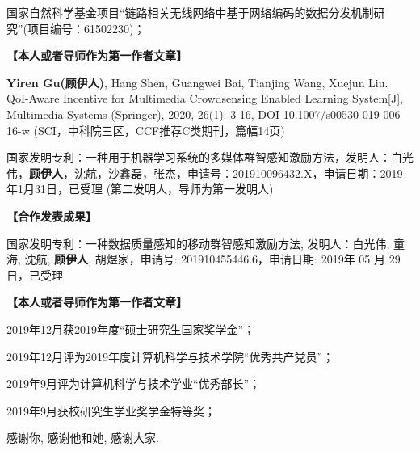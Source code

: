 

\project
\thispagestyle{onlytitle}
\begin{enumerate}[{[1]}]
	\item   国家自然科学基金项目“链路相关无线网络中基于网络编码的数据分发机制研究”(项目编号：61502230)；
\end{enumerate}


\achievement
\thispagestyle{onlytitle}
 \textbf{【本人或者导师作为第一作者文章】}
\begin{enumerate}[{[1]}]
	\item   \textbf{Yiren Gu(顾伊人)}, Hang Shen, Guangwei Bai, Tianjing Wang, Xuejun Liu. QoI-Aware Incentive for Multimedia Crowdsensing Enabled Learning System[J], Multimedia Systems (Springer), 2020, 26(1): 3-16, DOI 10.1007/s00530-019-006 16-w (SCI，中科院三区，CCF推荐C类期刊，篇幅14页)
	\item 国家发明专利：一种用于机器学习系统的多媒体群智感知激励方法，发明人：白光伟，\textbf{顾伊人}，沈航，沙鑫磊，张杰，申请号：201910096432.X，申请日期：2019年1月31日，已受理 (第二发明人，导师为第一发明人)
\end{enumerate}
\par
 \textbf{【合作发表成果】}
\begin{enumerate}[{[1]}]
	\item   国家发明专利：一种数据质量感知的移动群智感知激励方法, 发明人：白光伟, 童海, 沈航, \textbf{顾伊人}, 胡煜家，申请号: 201910455446.6，申请日期: 2019年 05 月 29 日，已受理
\end{enumerate}


\awards
\thispagestyle{onlytitle}
\textbf{【本人或者导师作为第一作者文章】}
\begin{enumerate}[{[1]}]
	\item 2019年12月获2019年度“硕士研究生国家奖学金”；
	\item 2019年12月评为2019年度计算机科学与技术学院“优秀共产党员”；
	\item 2019年9月评为计算机科学与技术学业“优秀部长”；
	\item 2019年9月获校研究生学业奖学金特等奖；
\end{enumerate}

\acknowledgement
\thispagestyle{onlytitle}

感谢你, 感谢他和她, 感谢大家.

  \iflib
  \else
  \newpage
  \cleardoublepage
  \fi







